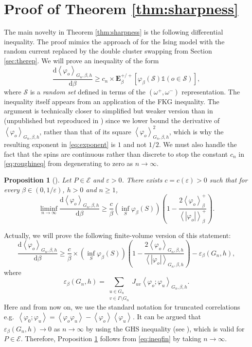 \documentclass{article}
\newtheorem{proposition}[theorem]{Proposition}
\numberwithin{equation}{section}
\theoremstyle{definition}
\theoremstyle{definition}
\theoremstyle{remark}
\renewcommand{\d}{\mathrm{d}}
\newcommand{\E}{\mathbb{E}}
\newcommand\vp{\varphi}
\newcommand\Ec{\mathcal{E}}
\renewcommand{\d}{\mathrm{d}}
\newcommand{\w}{\omega}
\renewcommand{\E}{\mathrm{\mathbf{E}}}
\renewcommand{\i}{\mathds{1}}
\renewcommand{\S}{\mathcal{S}}
\newcommand{\eps}{\varepsilon}
\newcommand{\G}{\Gamma}
\begin{document}
\section{Proof of Theorem \ref{thm:sharpness}}\label{sec:proof2}
The main novelty in Theorem \ref{thm:sharpness} is the following differential inequality. The proof mimics the approach of \cite[Lemma 2.6]{DCT} for the Ising model with the random current replaced by the double cluster swapping from Section \ref{sec:therep}. We will prove an inequality of the form
\begin{equation}\label{eq:roughineq}
	\frac{\d \left< \vp_o \right>_{G_n,\beta,h}}{\d \beta} \geq c_n \times \E^{+ / +}_\beta \left[ \vp_\beta(\S) \i(o \in \S) \right],
\end{equation}
where $\S$ is a \emph{random set} defined in terms of the $(\w^+,\w^-)$ representation. The inequality itself appears from an application of the FKG inequality. 
The argument is technically closer to simplified but weaker version than in \cite{DCT} (unpublished but reproduced in \cite[Appendix]{lis2019circle}) since we lower bound the derivative of $\left< \vp_o \right>_{G_n,\beta,h}$, rather than that of its square $\left< \vp_o \right>_{G_n,\beta,h}^{2}$, which is why the resulting exponent in \eqref{eq:exponent} is $1$ and not $1/2$. 
We must also handle the fact that the spins are continuous rather than discrete to stop the constant $c_n$ in \eqref{eq:roughineq} from degenerating to zero as $n \to \infty$.

\begin{proposition}[]\label{prop:mainineq}
	Let $P \in \Ec$ and $\eps > 0$. There exists $c = c(\eps) > 0$ such that for every $\beta \in (0,1/\eps)$, $h > 0$ and $n \geq 1$,
	\begin{equation}\label{eq:mainineq}
		\liminf_{n \to \infty} \frac{\d \left< \vp_o \right>_{G_n,\beta,h}}{\d \beta} \geq \frac{c}{\beta} \left( \inf_S \vp_\beta(S)  \right) \left( 1 - \frac{ 2\left< \vp_o \right>_{\beta}^+}{  \left< | \vp_o|  \right>_{\beta}^+}\right).
	\end{equation} 
\end{proposition}

Actually, we will prove the following finite-volume version of this statement:
\begin{equation}\label{eq:ineqfin}
	 \frac{\d \left< \vp_o \right>_{G_n,\beta,h}}{\d \beta} \geq \frac{c}{\beta} \times ( \inf_S \vp_\beta(S))  \left( 1 - \frac{2 \left< \vp_o \right>_{G_n,\beta,h}}{  \left< | \vp_o|  \right>_{G_n,\beta,h}}\right) - \varepsilon_\beta(G_n,h),
\end{equation} 
where 
\[
	\varepsilon_\beta(G_n,h) = \sum_{\substack{u \in G_n \\ v \in \G \setminus G_n}} J_{uv} \left< \vp_o; \vp_u \right>_{G_n,\beta,h}.
\]
Here and from now on, we use the standard notation for truncated correlations e.g.~$\left< \vp_0; \vp_u \right> = \left< \vp_o \vp_u \right>_{}^{} - \left< \vp_o \right>_{}^{} \left< \vp_u \right>_{}^{}$.
It can be argued that $\varepsilon_\beta(G_n,h) \to 0$ as $n \to \infty$ by using the GHS inequality (see \cite[Remark 2.3]{DCT}), which is valid for $P \in \Ec$. Therefore, Proposition \ref{prop:mainineq} follows from \eqref{eq:ineqfin} by taking $n \to \infty$. 
\end{document}

